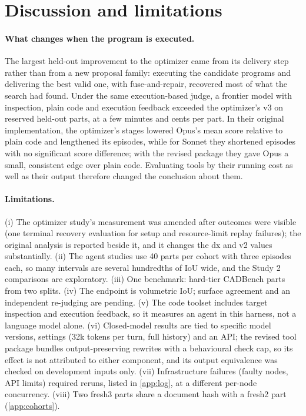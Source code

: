 \section{Discussion and limitations}
\label{sec:discussion}

\paragraph{What changes when the program is executed.} The largest held-out improvement to the optimizer came from its delivery step rather than from a new proposal family: executing the candidate programs and delivering the best valid one, with fuse-and-repair, recovered most of what the search had found. Under the same execution-based judge, a frontier model with inspection, plain code and execution feedback exceeded the optimizer's v3 on reserved held-out parts, at a few minutes and cents per part. In their original implementation, the optimizer's stages lowered Opus's mean score relative to plain code and lengthened its episodes, while for Sonnet they shortened episodes with no significant score difference; with the revised package they gave Opus a small, consistent edge over plain code. Evaluating tools by their running cost as well as their output therefore changed the conclusion about them.

\paragraph{Limitations.} (i) The optimizer study's measurement was amended after outcomes were visible (one terminal recovery evaluation for setup and resource-limit replay failures); the original analysis is reported beside it, and it changes the dx and v2 values substantially. (ii) The agent studies use 40 parts per cohort with three episodes each, so many intervals are several hundredths of IoU wide, and the Study 2 comparisons are exploratory. (iii) One benchmark: hard-tier CADBench parts from two splits. (iv) The endpoint is volumetric IoU; surface agreement and an independent re-judging are pending. (v) The code toolset includes target inspection and execution feedback, so it measures an agent in this harness, not a language model alone. (vi) Closed-model results are tied to specific model versions, settings (32k tokens per turn, full history) and an API; the revised tool package bundles output-preserving rewrites with a behavioural check cap, so its effect is not attributed to either component, and its output equivalence was checked on development inputs only. (vii) Infrastructure failures (faulty nodes, API limits) required reruns, listed in \cref{app:log}, at a different per-node concurrency. (viii) Two fresh3 parts share a document hash with a fresh2 part (\cref{app:cohorts}).
